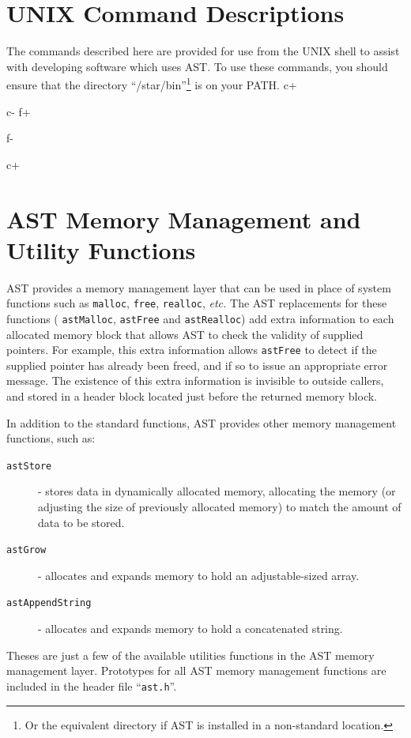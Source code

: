\documentclass[twoside,11pt]{article}
\begin{document}
\cleardoublepage
\section{\label{ss:commanddescriptions}UNIX Command Descriptions}
The commands described here are provided for use from the UNIX shell
to assist with developing software which uses AST. To use these
commands, you should ensure that the directory
``/star/bin''\footnote{Or the equivalent directory if AST is installed
in a non-standard location.} is on your PATH.
\small
c+

c-
f+

f-
\normalsize

c+
\cleardoublepage
\section{\label{ss:memoryfunctions}AST Memory Management and Utility Functions}
AST provides a memory management layer that can be used in place of
system functions such as {\tt malloc}, {\tt free}, {\tt realloc},
\emph{etc.} The AST replacements for these functions ( {\tt astMalloc},
{\tt astFree} and {\tt astRealloc}) add extra information to each
allocated memory block that allows AST to check the validity of supplied
pointers. For example, this extra information allows {\tt astFree} to
detect if the supplied pointer has already been freed, and if so to issue
an appropriate error message. The existence of this extra information is
invisible to outside callers, and stored in a header block located just
before the returned memory block.

In addition to the standard functions, AST provides other memory management
functions, such as:

\begin{description}
\item [{\tt astStore}] - stores data in dynamically allocated memory, allocating
the memory (or adjusting the size of previously allocated memory) to match
the amount of data to be stored.
\item [{\tt astGrow}] - allocates and expands memory to hold an adjustable-sized array.
\item [{\tt astAppendString}] - allocates and expands memory to hold a
concatenated string.
\end{description}

Theses are just a few of the available utilities functions in the AST
memory management layer. Prototypes for all AST memory management
functions are included in the header file ``{\tt ast.h}''.
\end{document}
